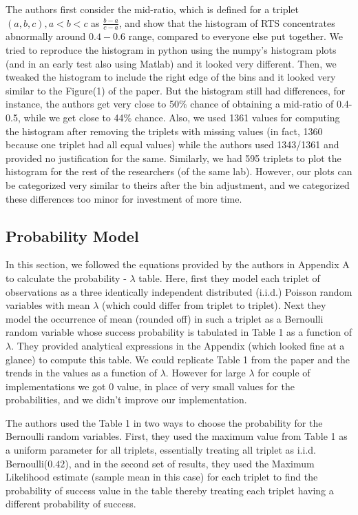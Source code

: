 \documentclass{article}
\begin{document}
The authors first consider the mid-ratio, which is defined for a triplet \((a, b, c), a<b<c\) as
\(\frac{b-a}{c-a}\), and show that the histogram of RTS concentrates
abnormally around \(0.4-0.6\) range, compared to everyone else put
together. We tried to reproduce the histogram in python using the
numpy's histogram plots (and in an early test also using Matlab) and it
looked very different. Then, we tweaked the histogram to include the
right edge of the bins and it looked very similar to the Figure(1) of
the paper. But the histogram still had differences, for instance, the
authors get very close to 50\% chance of obtaining a mid-ratio of
0.4-0.5, while we get close to 44\% chance. Also, we used 1361 values
for computing the histogram after removing the triplets with missing
values (in fact, 1360 because one triplet had all equal values) while
the authors used 1343/1361 and provided no justification for the same.
Similarly, we had 595 triplets to plot the histogram for the rest of the
researchers (of the same lab). However, our plots can be categorized
very similar to theirs after the bin adjustment, and we categorized
these differences too minor for investment of more time.

    \subsection{Probability Model}\label{probability-model}

In this section, we followed the equations provided by the authors in
Appendix A to calculate the probability - $\lambda$ table. Here, first they model each triplet of observations as a three identically independent distributed (i.i.d.) Poisson random variables with mean $\lambda$ (which could differ from triplet to triplet). Next they model the occurrence of mean (rounded off) in such a triplet as a Bernoulli random variable whose success probability is tabulated in Table 1 as a function of $\lambda$. They provided analytical expressions in the Appendix (which looked fine at a glance) to compute this table. We could
replicate Table 1 from the paper and the trends in the values as a function of $\lambda$. However for large $\lambda$ for couple of implementations we got $0$ value, in place of very small values for the probabilities, and we didn't improve our implementation.

The authors used the Table 1 in two ways to choose the probability for the Bernoulli random variables. First, they used the maximum value from Table 1 as a uniform parameter for all triplets, essentially treating all triplet as i.i.d. Bernoulli($0.42$), and in the second set of results, they used the Maximum Likelihood estimate (sample mean in this case) for each triplet to find the probability of success value in the table thereby treating each triplet having a different probability of success.
\end{document}
